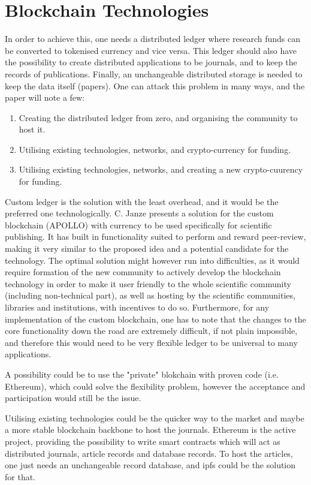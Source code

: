 \documentclass[12pt, a4paper]{article}
\begin{document}
\section{Blockchain Technologies}

In order to achieve this, one needs a distributed ledger where research funds can be converted to tokenised currency and vice versa. This ledger should also have the possibility to create distributed applications to be journals, and to keep the records of publications. Finally, an unchangeable distributed storage is needed to keep the data itself (papers). One can attack this problem in many ways, and the paper will note a few:
\begin{enumerate}
	\item Creating the distributed ledger from zero, and organising the community to host it.
	\item Utilising existing technologies, networks, and crypto-currency for funding.
	\item Utilising existing technologies, networks, and creating a new crypto-cuurency for funding.
\end{enumerate}
Custom ledger is the solution with the least overhead, and it would be the preferred one technologically. C. Janze \cite{janze2017design} presents a solution for the custom blockchain (APOLLO) with currency to be used specifically for scientific publishing. It has built in functionality suited to perform and reward peer-review, making it very similar to the proposed idea and a potential candidate for the technology. The optimal solution might however run into difficulties, as it would require formation of the new community to actively develop the blockchain technology in order to make it user friendly to the whole scientific community (including non-technical part), as well as hosting by the scientific communities, libraries and institutions, with incentives to do so. Furthermore, for any implementation of the custom blockchain, one has to note that the changes to the core functionality down the road are extremely difficult, if not plain impossible, and therefore this would need to be very flexible ledger to be universal to many applications.

A possibility could be to use the "private" blokchain with proven code (i.e. Ethereum), which could solve the flexibility problem, however the acceptance and participation would still be the issue.

Utilising existing technologies could be the quicker way to the market and maybe a more stable blockchain backbone to host the journals. Ethereum \cite{ethereum-1} is the active project, providing the possibility to write smart contracts which will act as distributed journals, article records and database records. To host the articles, one just needs an unchangeable record database, and ipfs \cite{ipfs-1} could be the solution for that.
\end{document}
